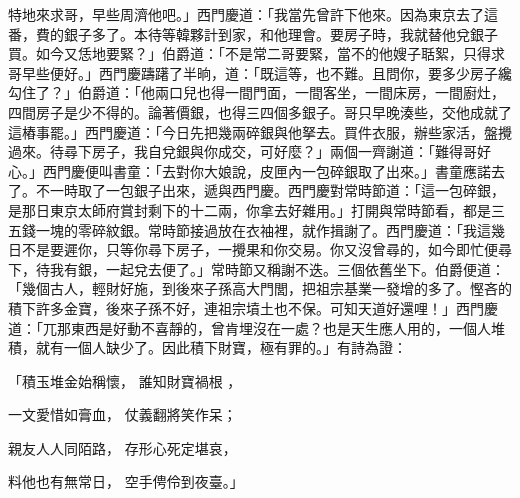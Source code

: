 \begin{showcontents}{}
特地來求哥，早些周濟他吧。」西門慶道：「我當先曾許下他來。因為東京去了這番，費的銀子多了。本待等韓夥計到家，和他理會。要房子時，我就替他兌銀子買。如今又恁地要緊？」伯爵道：「不是常二哥要緊，當不的他嫂子聒絮，只得求哥早些便好。」西門慶躊躇了半晌，道：「既這等，也不難。且問你，要多少房子纔勾住了？」伯爵道：「他兩口兒也得一間門面，一間客坐，一間床房，一間廚灶，四間房子是少不得的。論著價銀，也得三四個多銀子。哥只早晚湊些，交他成就了這樁事罷。」西門慶道：「今日先把幾兩碎銀與他拏去。買件衣服，辦些家活，盤攪過來。待尋下房子，我自兌銀與你成交，可好麼？」兩個一齊謝道：「難得哥好心。」西門慶便叫書童：「去對你大娘說，皮匣內一包碎銀取了出來。」書童應諾去了。不一時取了一包銀子出來，遞與西門慶。西門慶對常時節道：「這一包碎銀，是那日東京太師府賞封剩下的十二兩，你拿去好雜用。」打開與常時節看，都是三五錢一塊的零碎紋銀。常時節接過放在衣袖裡，就作揖謝了。西門慶道：「我這幾日不是要遲你，只等你尋下房子，一攪果和你交易。你又沒曾尋的，如今即忙便尋下，待我有銀，一起兌去便了。」常時節又稱謝不迭。三個依舊坐下。伯爵便道：「幾個古人，輕財好施，到後來子孫高大門閭，把祖宗基業一發增的多了。慳吝的積下許多金寶，後來子孫不好，連祖宗墳土也不保。可知天道好還哩！」西門慶道：「兀那東西是好動不喜靜的，曾肯埋沒在一處？也是天生應人用的，一個人堆積，就有一個人缺少了。因此積下財寶，極有罪的。」有詩為證：

「積玉堆金始稱懷，  誰知財寶禍根 ，

一文愛惜如膏血，  仗義翻將笑作呆；

親友人人同陌路，  存形心死定堪哀，

料他也有無常日，  空手俜伶到夜臺。」


\end{showcontents}
